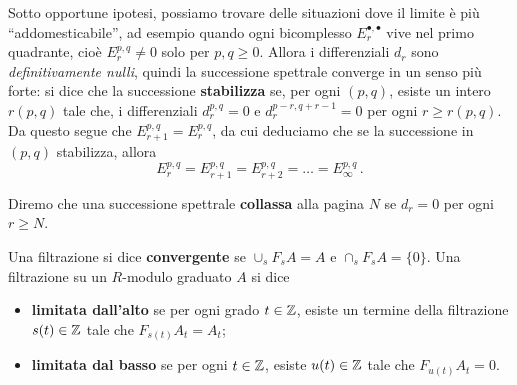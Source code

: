Sotto opportune ipotesi,
possiamo trovare delle situazioni dove il limite è più ``addomesticabile'',
ad esempio quando ogni bicomplesso $E^{\bullet,\bullet}_{r}$ vive nel primo quadrante,
cioè $E^{p,q}_{r} \ne 0$ solo per $p,q \ge 0$.
Allora i differenziali $d_{r}$ sono \emph{definitivamente nulli},
quindi la successione spettrale converge in un senso più forte:
si dice che la successione \textbf{stabilizza} se, per ogni $(p,q)$,
esiste un intero $r(p,q)$ tale che,
i differenziali $d_{r}^{p,q}=0$ e $d^{p-r,q+r-1}_{r}=0$ per ogni $r \ge r(p,q)$.
Da questo segue che $E_{r+1}^{p,q}=E_{r}^{p,q}$, da cui deduciamo che
se la successione in $(p,q)$ stabilizza, allora
\begin{equation*}
	E^{p,q}_{r} = E^{p,q}_{r+1} = E^{p,q}_{r+2} = \dots = E^{p,q}_{\infty}\,.
\end{equation*}

\begin{df}
	Diremo che una successione spettrale \textbf{collassa} alla pagina $N$
	se $d_{r}=0$ per ogni $r \ge N$.
\end{df}

\begin{df}
	Una filtrazione si dice \textbf{convergente} se $\cup_{s} F_{s}A = A$
	e $\cap_{s} F_{s}A = \{0\}$.
	Una filtrazione su un $R$-modulo graduato $A$ si dice 
	\begin{itemize}
		\item  \textbf{limitata dall'alto} se per ogni grado $t \in {\mathbb Z}$, 
		esiste un termine della filtrazione $s(t) \in {\mathbb Z}$ tale che $F_{s(t)}A_{t}=A_{t}$;
		\item  \textbf{limitata dal basso} se per ogni $t \in {\mathbb Z}$, esiste $u(t) \in {\mathbb Z}$
		tale che $F_{u(t)}A_{t} = 0$.
	\end{itemize}
\end{df}

%
%
%
%
%
%
%
%

